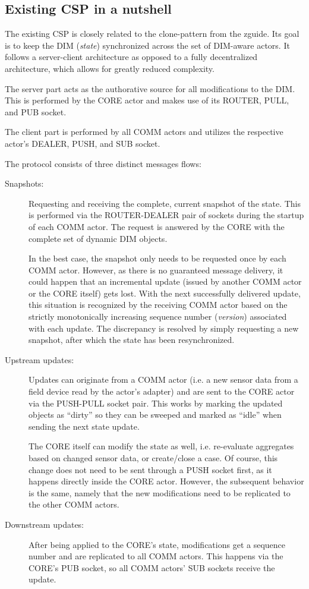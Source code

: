 \subsection{Existing CSP in a nutshell}\label{sec:scope:csp}
The existing \acrfull{CSP} is closely related to the \gls{clone-pattern} from
the \gls{zguide}. Its goal is to keep the \gls{DIM} (\emph{state}) synchronized
across the set of DIM-aware actors.  It follows a server-client architecture as
opposed to a fully decentralized architecture, which allows for greatly reduced
complexity.

The server part acts as the authorative source for all modifications to the
DIM. This is performed by the CORE actor and makes use of its ROUTER, PULL, and
PUB socket.

The client part is performed by all COMM actors and utilizes the respective
actor's DEALER, PUSH, and SUB socket.

The protocol consists of three distinct messages flows:

\begin{description}
	\item [Snapshots:]
		Requesting and receiving the complete, current snapshot of the
		state. This is performed via the ROUTER-DEALER pair of sockets
		during the startup of each COMM actor. The request is answered
		by the CORE with the complete set of dynamic DIM objects.

		In the best case, the snapshot only needs to be requested once
		by each COMM actor. However, as there is no guaranteed message
		delivery, it could happen that an incremental update (issued by
		another COMM actor or the CORE itself) gets lost. With the next
		successfully delivered update, this situation is recognized by
		the receiving COMM actor based on the strictly monotonically
		increasing sequence number (\emph{version}) associated with
		each update. The discrepancy is resolved by simply requesting a
		new snapshot, after which the state has been resynchronized.

	\item [Upstream updates:]
		Updates can originate from a COMM actor (i.e. a new sensor data
		from a field device read by the actor's adapter) and are sent to the
		CORE actor via the PUSH-PULL socket pair.  This works by
		marking the updated objects as ``dirty'' so they can be sweeped
		and marked as ``idle'' when sending the next state update.

		The CORE itself can modify the state as well, i.e. re-evaluate
		aggregates based on changed sensor data, or create/close a
		case. Of course, this change does not need to be sent through a
		PUSH socket first, as it happens directly inside the CORE
		actor. However, the subsequent behavior is the same, namely
		that the new modifications need to be replicated to the other
		COMM actors.

	\item [Downstream updates:]
		After being applied to the CORE's state,
		modifications get a sequence number and are replicated to all
		COMM actors. This happens via the CORE's PUB socket, so all
		COMM actors' SUB sockets receive the update.
\end{description}


